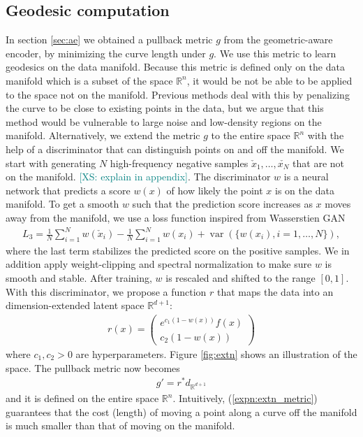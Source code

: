 \documentclass{article}
\theoremstyle{plain}
\theoremstyle{definition}
\theoremstyle{remark}
\newcommand{\xin}[1]{\textcolor{teal}{[XS: #1]}}
\begin{document}
\subsection{Geodesic computation}\label{sec:geodesic}
\par In section \ref{sec:ae} we obtained a pullback metric $g$ from the geometric-aware encoder, by minimizing the curve length under $g$. We use this metric to learn geodesics on the data manifold. Because this metric is defined only on the data manifold which is a subset of the space $\mathbb R^n$, it would be not be able to be applied to the space not on the manifold. Previous methods \cite{fasina2023neural,huguet2022manifold} deal with this by penalizing the curve to be close to existing points in the data, but we argue that this method would be vulnerable to large noise and low-density regions on the manifold. Alternatively, we extend the metric $g$ to the entire space $\mathbb R^n$ with the help of a discriminator that can distinguish points on and off the manifold. We start with generating $N$ high-frequency negative samples $\check x_1,\dots,\check{x_N}$ that are not on the manifold. \xin{explain in appendix}. The discriminator $w$ is a neural network that predicts a score $w(x)$ of how likely the point $x$ is on the data manifold. To get a smooth $w$ such that the prediction score increases as $x$ moves away from the manifold, we use a loss function inspired from Wasserstien GAN \cite{arjovsky2017wasserstein}
\begin{align}
    L_3=\frac{1}{N}\sum_{i=1}^N w(\check x_i)-\frac{1}{N}\sum_{i=1}^N w(x_i)+\operatorname{var}(\{w(x_i),i=1,\dots,N\}),
\end{align}
where the last term stabilizes the predicted score on the positive samples. We in addition apply weight-clipping and spectral normalization to make sure $w$ is smooth and stable. After training, $w$ is rescaled and shifted to the range $[0,1]$. With this discriminator, we propose a function $r$ that maps the data into an dimension-extended latent space $\mathbb R^{d+1}$:
\begin{align}
    r(x)=\left(\begin{matrix}
        e^{c_1(1-w(x))}f(x)\\c_2(1-w(x))
    \end{matrix}\right)\label{expn:extn}
\end{align}
where $c_1,c_2>0$ are hyperparameters.
Figure \ref{fig:extn} shows an illustration of the space. The pullback metric now becomes 
\begin{align}
    g'=r^*d_{\mathbb R^{d+1}}\label{expn:extn_metric}
\end{align} and it is defined on the entire space $\mathbb R^{n}$. Intuitively, (\ref{expn:extn_metric}) guarantees that the cost (length) of moving a point along a curve off the manifold is much smaller than that of moving on the manifold.
\end{document}
